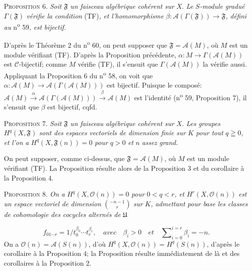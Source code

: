 \textsc{Proposition} 6. \textit{Soit} $\mathfrak{F}$ \textit{un faisceau algébrique cohérent sur} $X$. \textit{Le} $S$\textit{-module gradué} $\Gamma(\mathfrak{F})$ \textit{vérifie la condition} (TF)\textit{, et l'homomorphisme} $\beta : \mathcal{A}(\Gamma(\mathfrak{F})) \to \mathfrak{F}$\textit{, défini au} n\textsuperscript{o} 59\textit{, est bijectif.}

D'après le Théorème 2 du n\textsuperscript{o} 60, on peut supposer que $\mathfrak{F} = \mathcal{A}(M)$, où $M$ est un module vérifiant (TF). D'après la Proposition précédente, $\alpha : M \to \Gamma(\mathcal{A}(M))$ est $\mathcal{C}$-bijectif; comme $M$ vérifie (TF), il s'ensuit que $\Gamma(\mathcal{A}(M))$ la vérifie aussi. Appliquant la Proposition 6 du n\textsuperscript{o} 58, on voit que $\alpha : \mathcal{A}(M) \to \mathcal{A}(\Gamma(\mathcal{A}(M)))$ est bijectif. Puisque le composé: $\mathcal{A}(M) \xrightarrow{\ \alpha\ } \mathcal{A}(\Gamma(\mathcal{A}(M))) \xrightarrow{\ \beta\ } \mathcal{A}(M)$ est l'identité (n\textsuperscript{o} 59, Proposition 7), il s'ensuit que $\beta$ est bijectif, cqfd.

\textsc{Proposition} 7. \textit{Soit} $\mathfrak{F}$ \textit{un faisceau algébrique cohérent sur} $X$. \textit{Les groupes} $H^q(X, \mathfrak{F})$ \textit{sont des espaces vectoriels de dimension finie sur} $K$ \textit{pour tout} $q \geqq 0$\textit{, et l'on a} $H^q(X, \mathfrak{F}(n)) = 0$ \textit{pour} $q > 0$ \textit{et} $n$ \textit{assez grand.}

On peut supposer, comme ci-dessus, que $\mathfrak{F} = \mathcal{A}(M)$, où $M$ est un module vérifiant (TF). La Proposition résulte alors de la Proposition 3 et du corollaire à la Proposition 4.

\textsc{Proposition} 8. \textit{On a} $H^q(X, \mathcal{O}(n)) = 0$ \textit{pour} $0 < q < r$\textit{, et} $H^r(X, \mathcal{O}(n))$ \textit{est un espace vectoriel de dimension} $\binom{-n-1}{r}$ \textit{sur} $K$\textit{, admettant pour base les classes}
\textit{de cohomologie des cocycles alternés de} $\mathfrak{U}$

\begin{equation*}
f_{01\cdots r} = 1/t_0^{\beta_0} \cdots t_r^{\beta_r}, \quad \mathit{avec} \quad \beta_i > 0 \quad \mathit{et} \quad \sum\nolimits_{i=0}^{i=r} \beta_i = -n.
\end{equation*}
On a $\mathcal{O}(n) = \mathcal{A}(S(n))$, d'où $H^q(X, \mathcal{O}(n)) = H^q(S(n))$, d'après le corollaire à la Proposition 4; la Proposition résulte immédiatement de là et des corollaires à la Proposition 2.

